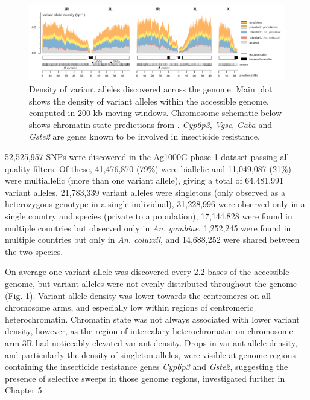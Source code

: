 \documentclass[a4paper,11pt,abstracton,hidelinks]{scrartcl}
\begin{document}
\begin{figure}[t!]
\centering
\includegraphics[width=1.1\textwidth,center]{artwork/chapter3/variant_density.png}
\caption{Density of variant alleles discovered across the genome.
%
Main plot shows the density of variant alleles within the accessible genome, computed in 200 kb moving windows.
%
Chromosome schematic below shows chromatin state predictions from \citet{Sharakhova2010}.
%
\textit{Cyp6p3}, \textit{Vgsc}, \textit{Gaba} and \textit{Gste2} are genes known to be involved in insecticide resistance.
}
%
\label{fig:variant_density}
\end{figure}


52,525,957 SNPs were discovered in the Ag1000G phase 1 dataset passing all quality filters.
%
Of these, 41,476,870 (79\%) were biallelic and 11,049,087 (21\%) were multiallelic (more than one variant allele), giving a total of 64,481,991 variant alleles.
%
21,783,339 variant alleles were singletons (only observed as a heterozygous genotype in a single individual), 31,228,996 were observed only in a single country and species (private to a population), 17,144,828 were found in multiple countries but observed only in \textit{An. gambiae}, 1,252,245 were found in multiple countries but only in \textit{An. coluzzii}, and 14,688,252 were shared between the two species.
%


On average one variant allele was discovered every 2.2 bases of the accessible genome,
but variant alleles were not evenly distributed throughout the genome (Fig. \ref{fig:variant_density}).
%
Variant allele density was lower towards the centromeres on all chromosome arms, and especially low within regions of centromeric heterochromatin.
%
Chromatin state was not always associated with lower variant density, however, as the region of intercalary heterochromatin on chromosome arm 3R had noticeably elevated variant density.
%
Drops in variant allele density, and particularly the density of singleton alleles, were visible at genome regions containing the insecticide resistance genes \textit{Cyp6p3} and \textit{Gste2}, suggesting the presence of selective sweeps in those genome regions, investigated further in Chapter 5.
\end{document}
